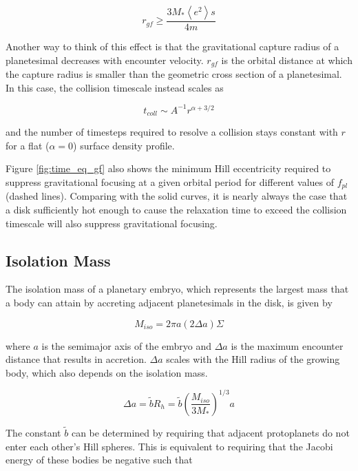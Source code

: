 \documentclass[onecolumn]{aastex63}
\begin{document}
\begin{equation}
    r_{gf} \geq \frac{3 M_{*} \left< e^{2} \right> s}{4 m}
\end{equation}

Another way to think of this effect is that the gravitational capture radius of a planetesimal decreases with encounter velocity. $r_{gf}$ is the orbital distance at which the capture radius is smaller than the geometric cross section of a planetesimal.  In this case, the collision timescale instead scales as 

\begin{equation}
    t_{coll} \sim A^{-1} r^{\alpha + 3/2}
\end{equation}

\noindent and the number of timesteps required to resolve a collision stays constant with $r$ for a flat ($\alpha = 0$) surface density profile.

Figure \ref{fig:time_eq_gf} also shows the minimum Hill eccentricity required to suppress gravitational focusing at a given orbital period for different values of $f_{pl}$ (dashed lines). Comparing with the solid curves, it is nearly always the case that a disk sufficiently hot enough to cause the relaxation time to exceed the collision timescale will also suppress gravitational focusing.

\subsection{Isolation Mass}

The isolation mass of a planetary embryo, which represents the largest mass that a body can attain by accreting adjacent planetesimals in the disk, is given by

\begin{equation}
    M_{iso} = 2 \pi a \left( 2 \Delta a \right) \Sigma
\end{equation}

\noindent where $a$ is the semimajor axis of the embryo and $\Delta a$ is the maximum encounter distance that results in accretion. $\Delta a$ scales with the Hill radius of the growing body, which also depends on the isolation mass.

\begin{equation}
    \Delta a = \tilde{b} R_{h} = \tilde{b} \left( \frac{M_{iso}}{3 M_{*}} \right)^{1/3} a
\end{equation}

The constant $\tilde{b}$ can be determined by requiring that adjacent protoplanets do not enter each other's Hill spheres. This is equivalent to requiring that the Jacobi energy of these bodies be negative such that \citep{Hayashi1977}
\end{document}
